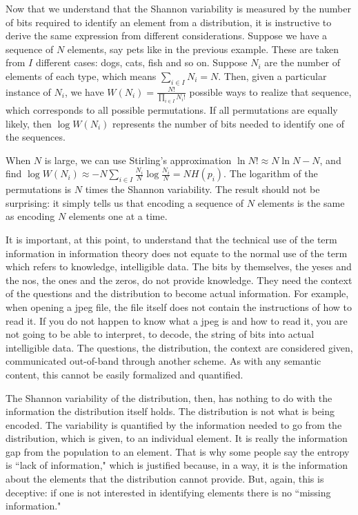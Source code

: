 \documentclass[prb, twocolumn]{revtex4-1}
\begin{document}
Now that we understand that the Shannon variability is measured by the number of bits required to identify an element from a distribution, it is instructive to derive the same expression from different considerations. Suppose we have a sequence of $N$ elements, say pets like in the previous example. These are taken from $I$ different cases: dogs, cats, fish and so on. Suppose $N_i$ are the number of elements of each type, which means $\sum_{i \in I} N_i = N$. Then, given a particular instance of $N_i$, we have $W(N_i) = \frac{N!}{\prod_{i \in I} N_i!}$ possible ways to realize that sequence, which corresponds to all possible permutations. If all permutations are equally likely, then $\log W (N_i)$ represents the number of bits needed to identify one of the sequences.

When $N$ is large, we can use Stirling's approximation $\ln N! \approx N \ln N - N$, and find $\log W(N_i) \approx - N \sum_{i \in I} \frac{N_i}{N} \log \frac{N_i}{N} = N H(p_i)$. The logarithm of the permutations is $N$ times the Shannon variability. The result should not be surprising: it simply tells us that encoding a sequence of $N$ elements is the same as encoding $N$ elements one at a time.

It is important, at this point, to understand that the technical use of the term information in information theory does not equate to the normal use of the term which refers to knowledge, intelligible data. The bits by themselves, the yeses and the nos, the ones and the zeros, do not provide knowledge. They need the context of the questions and the distribution to become actual information. For example, when opening a jpeg file, the file itself does not contain the instructions of how to read it. If you do not happen to know what a jpeg is and how to read it, you are not going to be able to interpret, to decode, the string of bits into actual intelligible data. The questions, the distribution, the context are considered given, communicated out-of-band through another scheme. As with any semantic content, this cannot be easily formalized and quantified.

The Shannon variability of the distribution, then, has nothing to do with the information the distribution itself holds. The distribution is not what is being encoded. The variability is quantified by the information needed to go from the distribution, which is given, to an individual element. It is really the information gap from the population to an element. That is why some people say the entropy is ``lack of information," which is justified because, in a way, it is the information about the elements that the distribution cannot provide. But, again, this is deceptive: if one is not interested in identifying elements there is no ``missing information."
\end{document}
